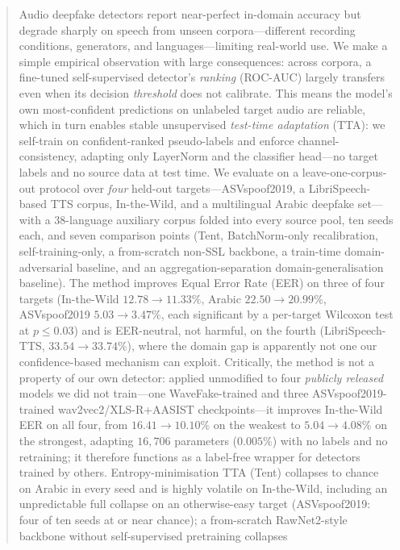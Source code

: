 \documentclass[conference]{IEEEtran}
\begin{document}
\begin{abstract}
Audio deepfake detectors report near-perfect in-domain accuracy but degrade
sharply on speech from unseen corpora---different recording conditions,
generators, and languages---limiting real-world use. We make a simple empirical
observation with large consequences: across corpora, a fine-tuned
self-supervised detector's \emph{ranking} (ROC-AUC) largely transfers even when
its decision \emph{threshold} does not calibrate. This means the model's own
most-confident predictions on unlabeled target audio are reliable, which in turn
enables stable unsupervised \emph{test-time adaptation} (TTA): we self-train on
confident-ranked pseudo-labels and enforce channel-consistency, adapting only
LayerNorm and the classifier head---no target labels and no source data at test
time. We evaluate on a leave-one-corpus-out protocol over \emph{four} held-out
targets---ASVspoof2019, a LibriSpeech-based TTS corpus, In-the-Wild, and a
multilingual Arabic deepfake set---with a 38-language auxiliary corpus folded
into every source pool, ten seeds each, and seven comparison
points (Tent, BatchNorm-only recalibration, self-training-only, a from-scratch
non-SSL backbone, a train-time domain-adversarial baseline, and an
aggregation-separation domain-generalisation baseline). The method improves
Equal Error Rate (EER) on three of four targets (In-the-Wild
$12.78\!\rightarrow\!11.33\%$, Arabic $22.50\!\rightarrow\!20.99\%$, ASVspoof2019
$5.03\!\rightarrow\!3.47\%$, each significant by a per-target Wilcoxon test at
$p\!\leq\!0.03$) and is EER-neutral, not harmful, on the fourth
(LibriSpeech-TTS, $33.54\!\rightarrow\!33.74\%$), where the domain gap is
apparently not one our confidence-based mechanism can exploit. Critically, the
method is not a property of our own detector: applied unmodified to four
\emph{publicly released} models we did not train---one WaveFake-trained and
three ASVspoof2019-trained wav2vec2/XLS-R+AASIST checkpoints---it improves
In-the-Wild EER on all four, from $16.41\!\rightarrow\!10.10\%$ on the weakest to
$5.04\!\rightarrow\!4.08\%$ on the strongest, adapting $16{,}706$ parameters
($0.005\%$) with no labels and no retraining; it therefore functions as a
label-free wrapper for detectors trained by others. Entropy-minimisation
TTA (Tent) collapses to chance on Arabic in every seed and is highly volatile on
In-the-Wild, including an unpredictable full collapse on an otherwise-easy target
(ASVspoof2019: four of ten seeds at or near chance); a
from-scratch RawNet2-style backbone without self-supervised pretraining collapses

\end{abstract}
\end{document}
